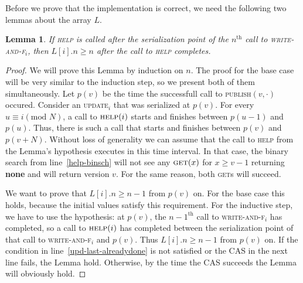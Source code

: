 \documentclass[a4paper,11pt]{article}
\def\none{\textbf{none} }
\newtheorem{lemma}{Lemma}
\newcommand{\fn}[1]{\textsc{#1}}
\begin{document}
Before we prove that the implementation is correct, we need the following two lemmas about the array $L$.

\begin{lemma}
	If \fn{help} is called after the serialization point of the $n^{\text{th}}$ call to \fn{write-and-f$_i$}, then $L[i].n \geq n$ after the call to \fn{help} completes. \label{last-is-complete}
\end{lemma}
\begin{proof}
	We will prove this Lemma by induction on $n$. The proof for the base case will be very similar to the induction step, so we present both of them simultaneously.
	Let $p(v)$ be the time the successfull call to \fn{publish}$(v, \cdot)$ occured. Consider an \fn{update$_i$} that was serialized at $p(v)$.
	For every $u \equiv i \left(\mbox{mod } N\right)$, a call to $\fn{help}(i)$ starts and finishes between $p(u-1)$ and $p(u)$. Thus, there is such a call that starts and finishes between $p(v)$ and $p(v+N)$.
	Without loss of generality we can assume that the call to \fn{help} from the Lemma's hypothesis executes in this time interval. In that case, the binary search from line~\ref{help-binsch} will not see any
	$\fn{get}(x)$ for $x \geq v-1$ returning \none and will	return version $v$. For the same reason, both \fn{get}s will succeed.

	We want to prove that $L[i].n \geq n-1$ from $p(v)$ on. For the base case this holds, because the initial values satisfy this requirement. For the inductive step, we have to use the hypothesis:
	at $p(v)$, the $n-1^{\text{th}}$ call to \fn{write-and-f$_i$} has completed, so a call to $\fn{help}(i)$ has completed between the serialization point of that call to \fn{write-and-f$_i$}
	and $p(v)$. Thus $L[i].n \geq n-1$ from $p(v)$ on. If the condition in line~\ref{upd-last-alreadydone} is not satisfied or the CAS in the next line fails, the Lemma hold.
	Otherwise, by the time the CAS succeeds the Lemma will obviously hold.
	
\end{proof}
\end{document}

